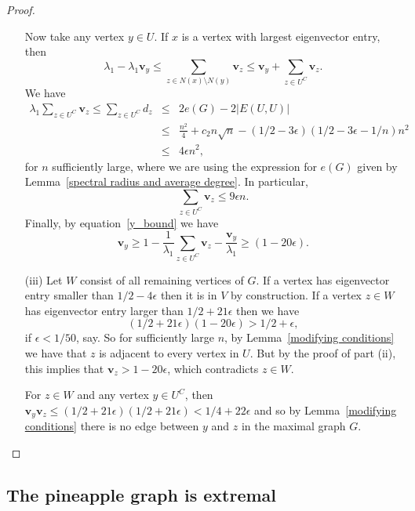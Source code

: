 \begin{proof}
\begin{itemize}
Now take any vertex $y \in U$.  If $x$ is a vertex with largest eigenvector entry, then 
\begin{equation}\label{y_bound}
 \lambda_1 - \lambda_1 \mathbf{v}_y \leq \sum_{z \in N(x) \setminus N(y)} \mathbf{v}_z \leq \mathbf{v}_y + \sum_{z \in U^C} \mathbf{v}_z . 
\end{equation}
We have
 \begin{eqnarray*}
  \lambda_1 \sum_{z \in U^C} \mathbf{v}_z \leq \sum_{z \in U^C} d_z &\leq& 2e(G) - 2|E(U,U)|\\
   &\leq& \frac{n^2}{4} + c_2 n \sqrt{n} - (1/2 - 3\epsilon)(1/2 - 3 \epsilon - 1/n) n^2 \\
   &\leq & 4 \epsilon n^2 ,
 \end{eqnarray*}
for $n$ sufficiently large, where we are using the expression for $e(G)$ given by Lemma~\ref{spectral radius and average degree}.
In particular,
 \[ \sum_{z \in U^C} \mathbf{v}_z \leq 9 \epsilon n .\] 
Finally, by equation~\ref{y_bound} we have 
 \[ \mathbf{v}_y \geq 1 - \frac{1}{\lambda_1} \sum_{z \in U^C} \mathbf{v}_z -\frac{\mathbf{v}_y}{\lambda_1} \geq (1 - 20 \epsilon) .\]
 
\item[(iii)] Let $W$ consist of all remaining vertices of $G$.  If a vertex 
has eigenvector entry smaller than $1/2 - 4\epsilon$ then it is in $V$ by
construction.  If a vertex $z \in W$ has eigenvector entry larger than $1/2 + 21\epsilon$
then we have
 \[ (1/2 + 21 \epsilon) (1 - 20 \epsilon) > 1/2 + \epsilon, \]
if $\epsilon < 1/50$, say.   So for sufficiently large $n$, by Lemma~\ref{modifying conditions} we 
have that $z$ is adjacent to every vertex in $U$.  But by the proof of part (ii), this implies that $\mathbf{v}_z > 1 - 20\epsilon$, which contradicts $z \in W$.

For $z \in W$ and any vertex $y \in U^C$, then 
 $\mathbf{v}_y\mathbf{v}_z \leq (1/2 + 21 \epsilon)(1/2 + 21\epsilon) < 1/4 + 22 \epsilon$
and so by Lemma~\ref{modifying conditions} there is no edge between $y$ and 
$z$ in the maximal graph $G$.
\end{itemize}
\end{proof}

\subsection{The pineapple graph is extremal}


